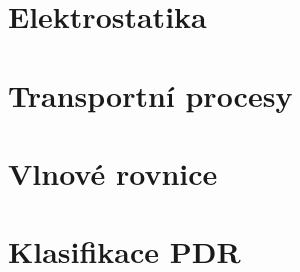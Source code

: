 \section{Elektrostatika}
\section{Transportní procesy}
\section{Vlnové rovnice}
\section{Klasifikace PDR}